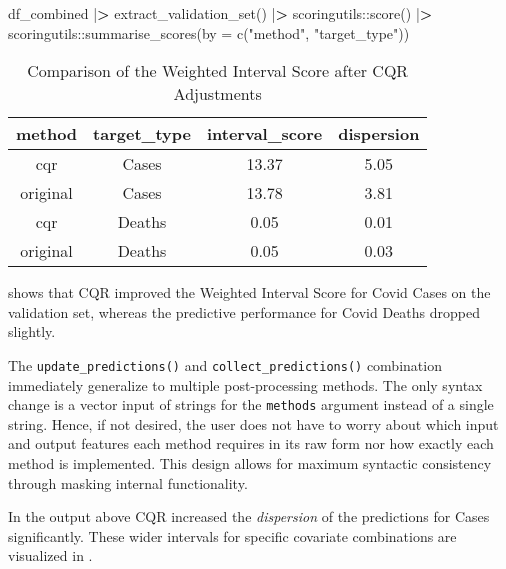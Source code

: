 \documentclass[
]{article}
\newenvironment{Shaded}{\begin{snugshade}}{\end{snugshade}}
\newcommand{\AttributeTok}[1]{\textcolor[rgb]{0.77,0.63,0.00}{#1}}
\newcommand{\ErrorTok}[1]{\textcolor[rgb]{0.64,0.00,0.00}{\textbf{#1}}}
\newcommand{\FunctionTok}[1]{\textcolor[rgb]{0.00,0.00,0.00}{#1}}
\newcommand{\NormalTok}[1]{#1}
\newcommand{\SpecialCharTok}[1]{\textcolor[rgb]{0.00,0.00,0.00}{#1}}
\newcommand{\StringTok}[1]{\textcolor[rgb]{0.31,0.60,0.02}{#1}}
\begin{document}
\begin{Shaded}
\begin{Highlighting}[]
\NormalTok{df\_combined }\SpecialCharTok{|}\ErrorTok{\textgreater{}}
  \FunctionTok{extract\_validation\_set}\NormalTok{() }\SpecialCharTok{|}\ErrorTok{\textgreater{}}
\NormalTok{  scoringutils}\SpecialCharTok{::}\FunctionTok{score}\NormalTok{() }\SpecialCharTok{|}\ErrorTok{\textgreater{}}
\NormalTok{  scoringutils}\SpecialCharTok{::}\FunctionTok{summarise\_scores}\NormalTok{(}\AttributeTok{by =} \FunctionTok{c}\NormalTok{(}\StringTok{"method"}\NormalTok{, }\StringTok{"target\_type"}\NormalTok{))}
\end{Highlighting}
\end{Shaded}

\begin{table}

\caption{\label{tab:ch1-wis-table}Comparison of the Weighted Interval Score after CQR Adjustments}
\centering
\begin{tabular}[t]{cccc}
\toprule
method & target\_type & interval\_score & dispersion\\
\midrule
cqr & Cases & 13.37 & 5.05\\
original & Cases & 13.78 & 3.81\\
cqr & Deaths & 0.05 & 0.01\\
original & Deaths & 0.05 & 0.03\\
\bottomrule
\end{tabular}
\end{table}

 shows that CQR improved the Weighted Interval Score for Covid Cases on the validation set, whereas the predictive performance for Covid Deaths dropped slightly.

The \texttt{update\_predictions()} and \texttt{collect\_predictions()} combination immediately generalize to multiple post-processing methods.
The only syntax change is a vector input of strings for the \texttt{methods} argument instead of a single string.
Hence, if not desired, the user does not have to worry about which input and output features each method requires in its raw form nor how exactly each method is implemented.
This design allows for maximum syntactic consistency through masking internal functionality.

In the output above CQR increased the \emph{dispersion} of the predictions for Cases significantly.
These wider intervals for specific covariate combinations are visualized in .
\end{document}

